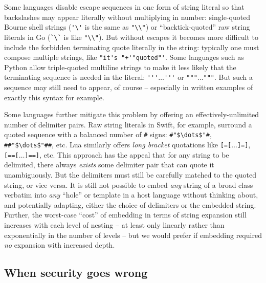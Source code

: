 Some languages disable escape sequences in one form of string literal
so that backslashes may appear literally without multiplying in number:
\eg single-quoted Bourne shell strings (\verb|'\'| is the same as \verb|"\\"|)
or ``backtick-quoted'' raw string literals
in Go (\verb|`\`| is like \verb|"\\"|).
But without escapes it becomes more difficult to include
the forbidden terminating quote literally in the string:
typically one must compose multiple strings,
like \verb|"it's "+'"quoted"'|.
Some languages such as Python allow triple-quoted multiline strings
to make it less likely that the terminating sequence is needed in the literal:
\eg \verb|'''|$\dots$\verb|'''| or \verb|"""|$\dots$\verb|"""|.
But such a sequence may still need to appear, of course --
especially in written examples of exactly this syntax for example.

Some languages further mitigate this problem
by offering an effectively-unlimited number of delimiter pairs.
Raw string literals in Swift, for example,
surround a quoted sequence with a balanced number of \verb|#| signs:
\eg \verb|#"$\dots$"#|, \verb|##"$\dots$"##|, etc.
Lua similarly offers \emph{long bracket} quotations
like \verb|[=[|$\dots$\verb|]=]|, \verb|[==[|$\dots$\verb|]==]|, etc.
This approach has the appeal that for any string to be delimited,
there always \emph{exists} some delimiter pair
that can quote it unambiguously.
But the delimiters must still be carefully matched to the quoted string,
or vice versa.
It is still not possible to embed \emph{any} string of a broad class
verbatim into \emph{any} ``hole'' or template in a host language
without thinking about, and potentially adapting,
either the choice of delimiters or the embedded string.
Further, the worst-case ``cost'' of embedding in terms of string expansion
still increases with each level of nesting --
at least only linearly rather than exponentially in the number of levels --
but we would prefer if embedding
required \emph{no} expansion with increased depth.



\subsection{When security goes wrong}

